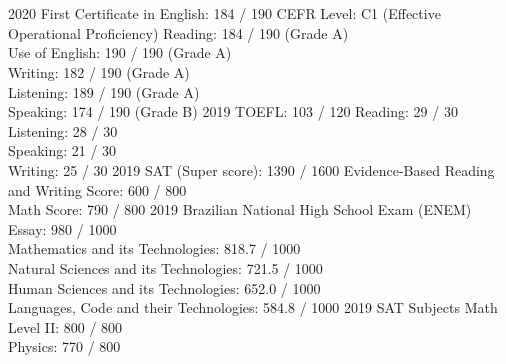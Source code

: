 \documentclass{cv}
\begin{document}
    \section*{}
        \begin{entrylist}
            \entry
                {2020}
                {First Certificate in English: 184 / 190}
                {CEFR Level: C1 (Effective Operational     Proficiency)}
                {Reading: 184 / 190 (Grade A)\\ Use of English: 190 / 190 (Grade A)\\ Writing: 182 / 190 (Grade A)\\ Listening: 189 / 190 (Grade A)\\ Speaking: 174 / 190 (Grade B)}
            \entry
                {2019}
                {TOEFL: 103 / 120} 
                {}
                {Reading: 29 / 30\\ Listening: 28 / 30    \\ Speaking: 21 / 30\\ Writing: 25 / 30}
            \entry
                {2019}
                {SAT (Super score): 1390 / 1600} 
                {}
                {Evidence-Based Reading and Writing Score: 600 / 800\\ Math Score: 790 / 800}
            \entry
                {2019}
                {Brazilian National High School Exam (ENEM)}
                {}
                {Essay: 980 / 1000\\ Mathematics and its Technologies: 818.7 / 1000\\ Natural Sciences and its Technologies: 721.5 / 1000\\ Human Sciences and its Technologies: 652.0 / 1000\\ Languages, Code and their Technologies: 584.8 / 1000}
            \entry
                {2019}
                {SAT Subjects}
                {}
                {Math Level II: 800 / 800\\ Physics: 770 / 800}
        \end{entrylist}
\end{document}
